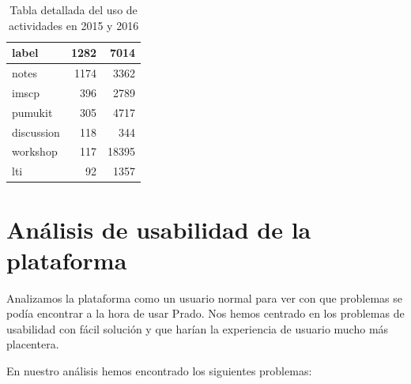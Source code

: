 \begin{table}[H]
\begin{tabular}{|l|r|r|}
label           & 1282          & 7014          \\ \hline
notes           & 1174          & 3362          \\ \hline
imscp           & 396           & 2789          \\ \hline
pumukit         & 305           & 4717          \\ \hline
discussion      & 118           & 344           \\ \hline
workshop        & 117           & 18395         \\ \hline
lti             & 92            & 1357          \\ \hline
\end{tabular}
\caption{Tabla detallada del uso de actividades en 2015 y 2016}
\label{table:usoactividades_2015}
\end{table}


\section{Análisis de usabilidad de la plataforma}

Analizamos la plataforma como un usuario normal para ver con que problemas se podía encontrar a la hora de usar Prado. Nos hemos centrado en los problemas de usabilidad con fácil solución y que harían la experiencia de usuario mucho más placentera.

\bigskip
En nuestro análisis hemos encontrado los siguientes problemas:

